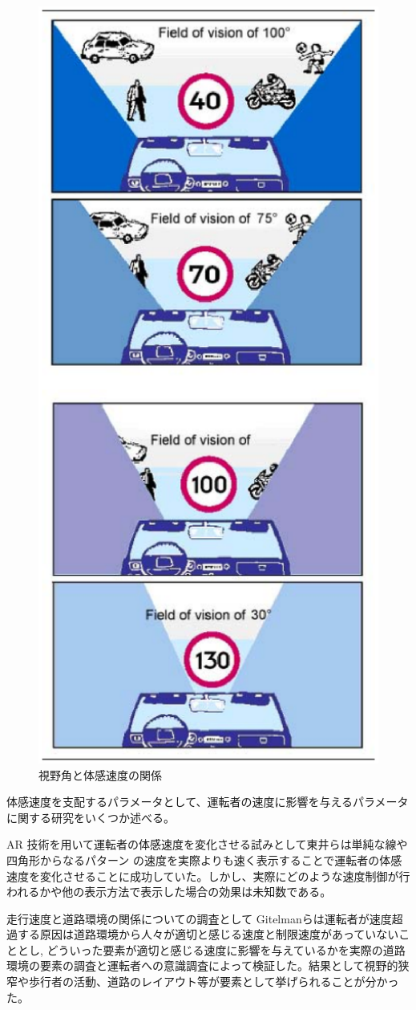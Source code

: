 \begin{figure}[h]
  \begin{center}
  \includegraphics[width=.5\linewidth]{img/1.eps}
  \caption{視野角と体感速度の関係\cite{taikan:speedmanagement}}
  \label{taikan:speed}
  \end{center}
\end{figure}

\clearpage
体感速度を支配するパラメータとして、運転者の速度に影響を与えるパラメータに関する研究をいくつか述べる。

AR 技術を用いて運転者の体感速度を変化させる試みとして東井ら\cite{taikan:higashii}は単純な線や四角形からなるパターン の速度を実際よりも速く表示することで運転者の体感速度を変化させることに成功していた。しかし、実際にどのような速度制御が行われるかや他の表示方法で表示した場合の効果は未知数である。

走行速度と道路環境の関係についての調査として Gitelman\cite{taikan:gitelman}らは運転者が速度超過する原因は道路環境から人々が適切と感じる速度と制限速度があっていないこととし, どういった要素が適切と感じる速度に影響を与えているかを実際の道路環境の要素の調査と運転者への意識調査によって検証した。結果として視野的狭窄や歩行者の活動、道路のレイアウト等が要素として挙げられることが分かった。

